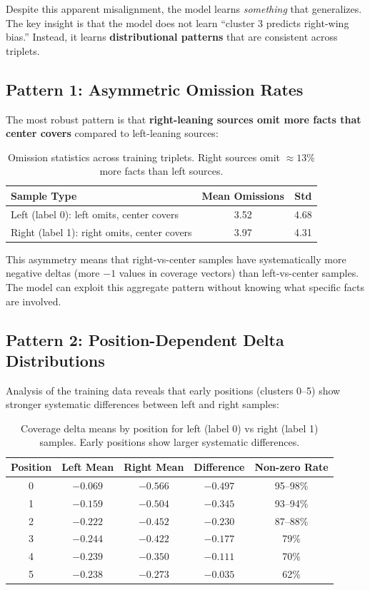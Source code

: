 \documentclass[12pt,a4paper]{article}
\begin{document}
Despite this apparent misalignment, the model learns \textit{something} that generalizes.
The key insight is that the model does not learn ``cluster 3 predicts right-wing bias.''
Instead, it learns \textbf{distributional patterns} that are consistent across triplets.

\subsection{Pattern 1: Asymmetric Omission Rates}

The most robust pattern is that \textbf{right-leaning sources omit more facts that center covers}
compared to left-leaning sources:

\begin{table}[h]
\centering
\begin{tabular}{lcc}
\hline
\textbf{Sample Type} & \textbf{Mean Omissions} & \textbf{Std} \\
\hline
Left (label 0): left omits, center covers & 3.52 & 4.68 \\
Right (label 1): right omits, center covers & 3.97 & 4.31 \\
\hline
\end{tabular}
\caption{Omission statistics across training triplets. Right sources omit $\approx 13\%$ more
facts than left sources.}
\label{tab:omission_rates}
\end{table}

This asymmetry means that right-vs-center samples have systematically more negative deltas
(more $-1$ values in coverage vectors) than left-vs-center samples. The model can exploit
this aggregate pattern without knowing what specific facts are involved.

\subsection{Pattern 2: Position-Dependent Delta Distributions}

Analysis of the training data reveals that early positions (clusters 0--5) show stronger
systematic differences between left and right samples:

\begin{table}[h]
\centering
\small
\begin{tabular}{ccccc}
\hline
\textbf{Position} & \textbf{Left Mean} & \textbf{Right Mean} & \textbf{Difference} & \textbf{Non-zero Rate} \\
\hline
0 & $-0.069$ & $-0.566$ & $-0.497$ & 95--98\% \\
1 & $-0.159$ & $-0.504$ & $-0.345$ & 93--94\% \\
2 & $-0.222$ & $-0.452$ & $-0.230$ & 87--88\% \\
3 & $-0.244$ & $-0.422$ & $-0.177$ & 79\% \\
4 & $-0.239$ & $-0.350$ & $-0.111$ & 70\% \\
5 & $-0.238$ & $-0.273$ & $-0.035$ & 62\% \\
\hline
\end{tabular}
\caption{Coverage delta means by position for left (label 0) vs right (label 1) samples.
Early positions show larger systematic differences.}
\label{tab:position_deltas}
\end{table}
\end{document}
